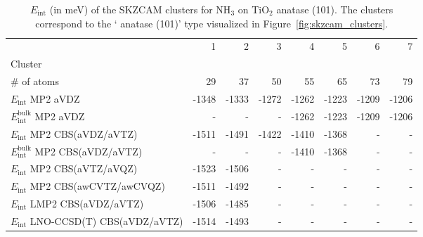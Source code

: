 \begin{table}
\caption{\label{tab:system_eint_a-tio2_nh3}$E_\textrm{int}$ (in meV) of the SKZCAM clusters for NH$_3$ on TiO$_2$ anatase (101). The clusters correspond to the ` anatase (101)' type visualized in Figure~\ref{fig:skzcam_clusters}.}
\begin{adjustbox}{center,max width=1.4\textwidth}
\begin{tabular}{lrrrrrrr}
\toprule
 & 1 & 2 & 3 & 4 & 5 & 6 & 7 \\ 
Cluster &  &  &  &  &  &  &  \\
\midrule
\# of atoms & 29 & 37 & 50 & 55 & 65 & 73 & 79 \\
$E_\textrm{int}$ MP2 aVDZ & -1348 & -1333 & -1272 & -1262 & -1223 & -1209 & -1206 \\
$E_\textrm{int}^\textrm{bulk}$ MP2 aVDZ & - & - & - & -1262 & -1223 & -1209 & -1206 \\
$E_\textrm{int}$ MP2 CBS(aVDZ/aVTZ) & -1511 & -1491 & -1422 & -1410 & -1368 & - & - \\
$E_\textrm{int}^\textrm{bulk}$ MP2 CBS(aVDZ/aVTZ) & - & - & - & -1410 & -1368 & - & - \\
$E_\textrm{int}$ MP2 CBS(aVTZ/aVQZ) & -1523 & -1506 & - & - & - & - & - \\
$E_\textrm{int}$ MP2 CBS(awCVTZ/awCVQZ) & -1511 & -1492 & - & - & - & - & - \\
$E_\textrm{int}$ LMP2 CBS(aVDZ/aVTZ) & -1506 & -1485 & - & - & - & - & - \\
$E_\textrm{int}$ LNO-CCSD(T) CBS(aVDZ/aVTZ) & -1514 & -1493 & - & - & - & - & - \\
\bottomrule
\end{tabular}
\end{adjustbox}
\end{table}
